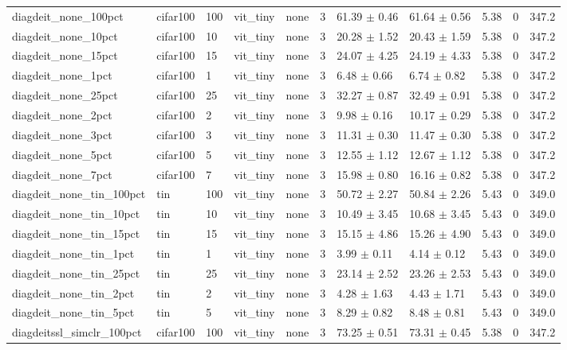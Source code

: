 \begin{tabular}{lllllllllll}
diagdeit_none_100pct & cifar100 & 100 & vit_tiny & none & 3 & 61.39 $\pm$ 0.46 & 61.64 $\pm$ 0.56 & 5.38 & 0 & 347.2 \\
diagdeit_none_10pct & cifar100 & 10 & vit_tiny & none & 3 & 20.28 $\pm$ 1.52 & 20.43 $\pm$ 1.59 & 5.38 & 0 & 347.2 \\
diagdeit_none_15pct & cifar100 & 15 & vit_tiny & none & 3 & 24.07 $\pm$ 4.25 & 24.19 $\pm$ 4.33 & 5.38 & 0 & 347.2 \\
diagdeit_none_1pct & cifar100 & 1 & vit_tiny & none & 3 & 6.48 $\pm$ 0.66 & 6.74 $\pm$ 0.82 & 5.38 & 0 & 347.2 \\
diagdeit_none_25pct & cifar100 & 25 & vit_tiny & none & 3 & 32.27 $\pm$ 0.87 & 32.49 $\pm$ 0.91 & 5.38 & 0 & 347.2 \\
diagdeit_none_2pct & cifar100 & 2 & vit_tiny & none & 3 & 9.98 $\pm$ 0.16 & 10.17 $\pm$ 0.29 & 5.38 & 0 & 347.2 \\
diagdeit_none_3pct & cifar100 & 3 & vit_tiny & none & 3 & 11.31 $\pm$ 0.30 & 11.47 $\pm$ 0.30 & 5.38 & 0 & 347.2 \\
diagdeit_none_5pct & cifar100 & 5 & vit_tiny & none & 3 & 12.55 $\pm$ 1.12 & 12.67 $\pm$ 1.12 & 5.38 & 0 & 347.2 \\
diagdeit_none_7pct & cifar100 & 7 & vit_tiny & none & 3 & 15.98 $\pm$ 0.80 & 16.16 $\pm$ 0.82 & 5.38 & 0 & 347.2 \\
diagdeit_none_tin_100pct & tin & 100 & vit_tiny & none & 3 & 50.72 $\pm$ 2.27 & 50.84 $\pm$ 2.26 & 5.43 & 0 & 349.0 \\
diagdeit_none_tin_10pct & tin & 10 & vit_tiny & none & 3 & 10.49 $\pm$ 3.45 & 10.68 $\pm$ 3.45 & 5.43 & 0 & 349.0 \\
diagdeit_none_tin_15pct & tin & 15 & vit_tiny & none & 3 & 15.15 $\pm$ 4.86 & 15.26 $\pm$ 4.90 & 5.43 & 0 & 349.0 \\
diagdeit_none_tin_1pct & tin & 1 & vit_tiny & none & 3 & 3.99 $\pm$ 0.11 & 4.14 $\pm$ 0.12 & 5.43 & 0 & 349.0 \\
diagdeit_none_tin_25pct & tin & 25 & vit_tiny & none & 3 & 23.14 $\pm$ 2.52 & 23.26 $\pm$ 2.53 & 5.43 & 0 & 349.0 \\
diagdeit_none_tin_2pct & tin & 2 & vit_tiny & none & 3 & 4.28 $\pm$ 1.63 & 4.43 $\pm$ 1.71 & 5.43 & 0 & 349.0 \\
diagdeit_none_tin_5pct & tin & 5 & vit_tiny & none & 3 & 8.29 $\pm$ 0.82 & 8.48 $\pm$ 0.81 & 5.43 & 0 & 349.0 \\
diagdeitssl_simclr_100pct & cifar100 & 100 & vit_tiny & none & 3 & 73.25 $\pm$ 0.51 & 73.31 $\pm$ 0.45 & 5.38 & 0 & 347.2 \\

\end{tabular}
